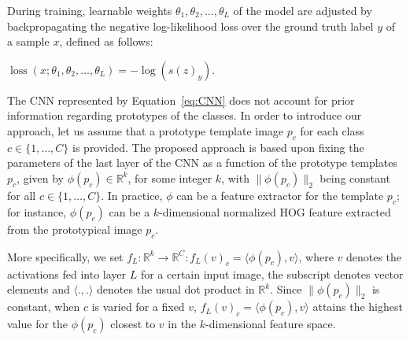 \documentclass{bmvc2k}
\newcommand{\R}{\mathbb{R}}
\begin{document}
During training, learnable weights $\theta_1, \theta_2, \ldots, \theta_L$ of the model are adjusted 
by backpropagating the negative log-likelihood loss over the ground truth label
${y}$ of a sample $x$, defined as follows:
\begin{center}
$\operatorname{loss}(x; \theta_1, \theta_2, \ldots, \theta_L) =
-\log(s(z)_{{y}}).$
\end{center}

The CNN represented by Equation~\eqref{eq:CNN} does not account for prior
information regarding prototypes of the classes. In order to introduce our
approach, let us assume that a prototype template image $p_{c}$ for each class
$c \in \{1,\ldots,C\}$ is provided. The proposed approach is based upon fixing the parameters of
the last layer of the CNN as a function of the prototype templates $p_c$, given by 
$\phi(p_{c})\in\mathbb{R}^{k}$, for some integer $k$, with $\|\phi(p_c)\|_2$ being constant for all $c
\in \{1,\ldots,C\}$. In practice, $\phi$ can be a feature extractor for the
template $p_c$; for instance, $\phi(p_c)$ can be a $k$-dimensional normalized HOG feature extracted from the
prototypical image $p_c$.

More specifically, we set $f_L : \R^k \to \R^C : f_L(v)_c = \langle\phi(p_c), v\rangle$, 
where $v$ denotes the activations fed into layer $L$ for a certain input
image, the subscript denotes vector elements and $\langle .,.\rangle$ denotes the usual dot product in $\R^k$. 
Since $\|\phi(p_c)\|_2$ is constant, when $c$ is varied for a fixed $v$,
$f_L(v)_c = \langle\phi(p_c), v\rangle$ attains the highest value for the
$\phi(p_c)$ closest to $v$ in the $k$-dimensional feature space.
\end{document}

